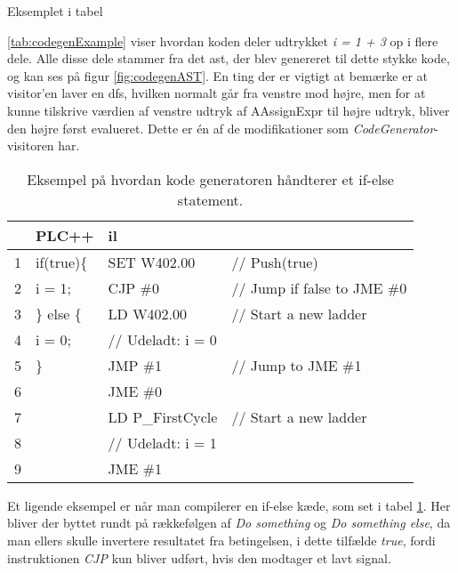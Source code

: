 \noindent Eksemplet i tabel {\ref{tab:codegenExample} viser hvordan koden deler udtrykket \textit{i = 1 + 3} op i flere dele. Alle disse dele stammer fra det \gls{ast}, der blev genereret til dette stykke kode, og kan ses på figur \ref{fig:codegenAST}. En ting der er vigtigt at bemærke er at visitor'en laver en \gls{dfs}, hvilken normalt går fra venstre mod højre, men for at kunne tilskrive værdien af venstre udtryk af AAssignExpr til højre udtryk, bliver den højre først evalueret. Dette er én af de modifikationer som \textit{CodeGenerator}-visitoren har.


\begin{table}[H]
    \centering\ttfamily
    \begin{tabular}{l|l|l l}
         &PLC++                 & \gls{il} \\\hline
        1&if(true)\{            & SET W402.00       &// Push(true)\\
        2&  i = 1;              & CJP \#0           &// Jump if false to JME \#0\\
        3&\} else \{            & LD W402.00        &// Start a new ladder\\
        4&  i = 0;              & // Udeladt: i = 0\\
        5& \}                   & JMP \#1           &// Jump to JME \#1\\
        6&                      & JME \#0           &\\
        7&                      & LD P\_FirstCycle  &// Start a new ladder\\
        8&                      & // Udeladt: i = 1\\
        9&                      & JME \#1
    \end{tabular}
    \caption{Eksempel på hvordan kode generatoren håndterer et if-else statement.}
    \label{tab:codegenIf}
\end{table}

\noindent Et ligende eksempel er når man compilerer en if-else kæde, som set i tabel \ref{tab:codegenIf}. Her bliver der byttet rundt på rækkefølgen af \textit{Do something} og \textit{Do something else}, da man ellers skulle invertere resultatet fra betingelsen, i dette tilfælde \textit{true}, fordi instruktionen \textit{CJP} kun bliver udført, hvis den modtager et lavt signal.

}
